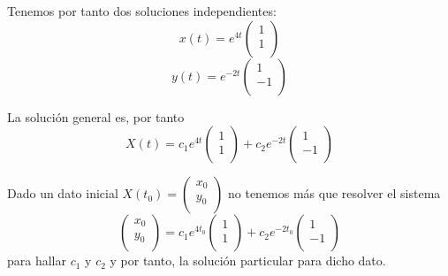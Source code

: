 \begin{example} [(Método 1)]
Tenemos por tanto dos soluciones independientes:
$$x(t) = e^{4t}\begin{pmatrix}
1\\1\\
\end{pmatrix}$$
$$y(t) = e^{-2t}\begin{pmatrix}
1\\-1\\
\end{pmatrix} $$

La solución general es, por tanto
$$X(t) = c_1e^{4t}\begin{pmatrix}
1\\1\\
\end{pmatrix} + c_2e^{-2t}\begin{pmatrix}
1\\-1\\
\end{pmatrix}$$

Dado un dato inicial $X(t_0) = \begin{pmatrix}
x_0\\y_0\\
\end{pmatrix}$ no tenemos más que resolver el sistema $$\begin{pmatrix}
x_0\\y_0\\
\end{pmatrix} =  c_1e^{4t_0}\begin{pmatrix}
1\\1\\
\end{pmatrix} + c_2e^{-2t_0}\begin{pmatrix}
1\\-1\\
\end{pmatrix}$$ para hallar $c_1$ y $c_2$ y por tanto, la solución particular para dicho dato.

\end{example}


